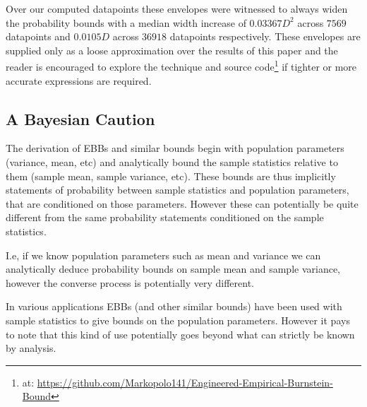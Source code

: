 \documentclass[aap,preprint]{imsart}
\begin{document}
Over our computed datapoints these envelopes were witnessed to always widen the probability bounds with a median width increase of $0.03367D^2$ across $7569$ datapoints and $0.0105D$ across $36918$ datapoints respectively.
These envelopes are supplied only as a loose approximation over the results of this paper and the reader is encouraged to explore the technique and source code\footnote{at: \href{https://github.com/Markopolo141/Engineered-Empirical-Burnstein-Bound}{https://github.com/Markopolo141/Engineered-Empirical-Burnstein-Bound}} if tighter or more accurate expressions are required.


 



\subsection{A Bayesian Caution}
The derivation of EBBs and similar bounds begin with population parameters (variance, mean, etc) and analytically bound the sample statistics relative to them (sample mean, sample variance, etc).
These bounds are thus implicitly statements of probability between sample statistics and population parameters, that are conditioned on those parameters.
However these can potentially be quite different from the same probability statements conditioned on the sample statistics.

I.e, if we know population parameters such as mean and variance we can analytically deduce probability bounds on sample mean and sample variance, however the converse process is potentially very different.

In various applications EBBs (and other similar bounds) have been used with sample statistics to give bounds on the population parameters. However it pays to note that this kind of use potentially goes beyond what can strictly be known by analysis.



\appendix
\end{document}
